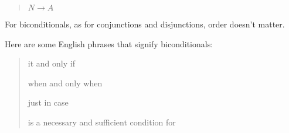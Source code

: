 \documentclass[../logic-text.tex]{subfiles}
\begin{document}
\begin{quote}


  \(N \rightarrow A\)
\end{quote}

For biconditionals, as for conjunctions and disjunctions, order doesn't matter.

Here are some English phrases that signify biconditionals:

\begin{quote}


  it and only if

  when and only when

  just in case

  is a necessary and sufficient condition for
\end{quote}
\end{document}
